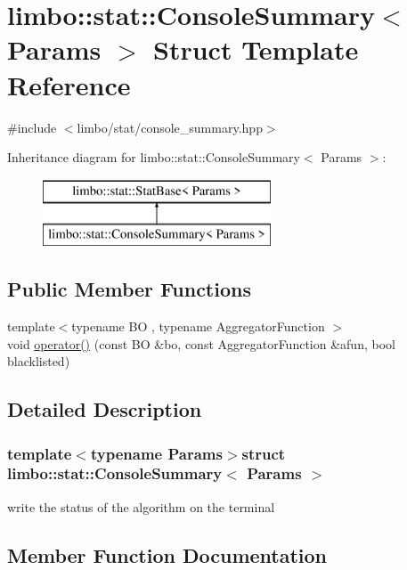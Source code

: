 \hypertarget{structlimbo_1_1stat_1_1_console_summary}{}\section{limbo\+:\+:stat\+:\+:Console\+Summary$<$ Params $>$ Struct Template Reference}
\label{structlimbo_1_1stat_1_1_console_summary}


{\ttfamily \#include $<$limbo/stat/console\+\_\+summary.\+hpp$>$}

Inheritance diagram for limbo\+:\+:stat\+:\+:Console\+Summary$<$ Params $>$\+:\begin{figure}[H]
\begin{center}
\leavevmode
\includegraphics[height=2.000000cm]{structlimbo_1_1stat_1_1_console_summary}
\end{center}
\end{figure}
\subsection*{Public Member Functions}
\begin{DoxyCompactItemize}
\item 
{\footnotesize template$<$typename B\+O , typename Aggregator\+Function $>$ }\\void \hyperlink{structlimbo_1_1stat_1_1_console_summary_a625436435af826082724dc112054c69a}{operator()} (const B\+O \&bo, const Aggregator\+Function \&afun, bool blacklisted)
\end{DoxyCompactItemize}


\subsection{Detailed Description}
\subsubsection*{template$<$typename Params$>$struct limbo\+::stat\+::\+Console\+Summary$<$ Params $>$}

write the status of the algorithm on the terminal 

\subsection{Member Function Documentation}
\hypertarget{structlimbo_1_1stat_1_1_console_summary_a625436435af826082724dc112054c69a}{}
